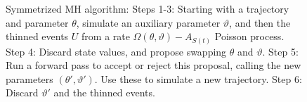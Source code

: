\begin{figure}[h!]
\begin{minipage}[hp]{0.32\linewidth}
  \end{minipage}
    \caption{Symmetrized MH algorithm: Steps 1-3: Starting with a trajectory and parameter $\theta$, simulate an auxiliary parameter $\vartheta$, and then the thinned events
      $U$ from a rate $\Omega(\theta,\vartheta) - A_{S(t)}$ Poisson
      process. Step 4: Discard state values, and propose swapping $\theta$ and $\vartheta$. Step 5:
      Run a forward pass to accept or reject this proposal, calling the new parameters $(\theta',\vartheta')$. 
    Use these to simulate a new trajectory. Step 6: Discard $\vartheta'$ and the thinned events.} 
   \label{fig:MH_improved}
  \end{figure}

